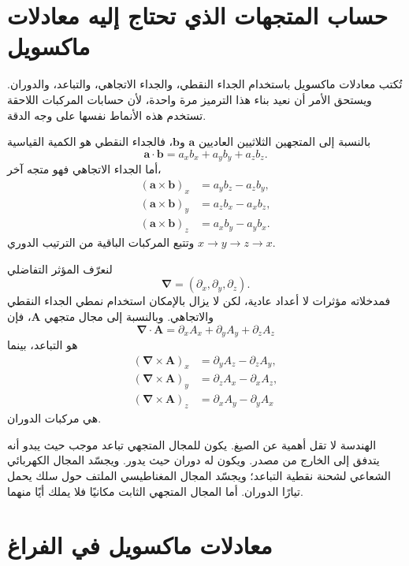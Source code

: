 \section{حساب المتجهات الذي تحتاج إليه معادلات ماكسويل}

تُكتب معادلات ماكسويل باستخدام الجداء النقطي، والجداء الاتجاهي، والتباعد، والدوران. ويستحق الأمر أن نعيد بناء هذا الترميز مرة واحدة، لأن حسابات المركبات اللاحقة تستخدم هذه الأنماط نفسها على وجه الدقة.

بالنسبة إلى المتجهين الثلاثيين العاديين \(\mathbf a\) و\(\mathbf b\)، فالجداء النقطي هو الكمية القياسية
\begin{equation}
\mathbf a\cdot\mathbf b
=a_xb_x+a_yb_y+a_zb_z.
\end{equation}
أما الجداء الاتجاهي فهو متجه آخر،
\begin{align}
(\mathbf a\times\mathbf b)_x&=a_yb_z-a_zb_y,\\
(\mathbf a\times\mathbf b)_y&=a_zb_x-a_xb_z,\\
(\mathbf a\times\mathbf b)_z&=a_xb_y-a_yb_x.
\end{align}
وتتبع المركبات الباقية من الترتيب الدوري \(x\to y\to z\to x\).

لنعرّف المؤثر التفاضلي
\begin{equation}
\boldsymbol\nabla=
\left(\partial_x,\partial_y,\partial_z\right).
\end{equation}
فمدخلاته مؤثرات لا أعداد عادية، لكن لا يزال بالإمكان استخدام نمطي الجداء النقطي والاتجاهي. وبالنسبة إلى مجال متجهي \(\mathbf A\)، فإن
\begin{equation}
\boldsymbol\nabla\cdot\mathbf A
=\partial_xA_x+\partial_yA_y+\partial_zA_z
\label{eq:divergence}
\end{equation}
هو التباعد، بينما
\begin{align}
(\boldsymbol\nabla\times\mathbf A)_x
 &=\partial_yA_z-\partial_zA_y,\\
(\boldsymbol\nabla\times\mathbf A)_y
 &=\partial_zA_x-\partial_xA_z,\\
(\boldsymbol\nabla\times\mathbf A)_z
 &=\partial_xA_y-\partial_yA_x
\label{eq:curl}
\end{align}
هي مركبات الدوران.

الهندسة لا تقل أهمية عن الصيغ. يكون للمجال المتجهي تباعد موجب حيث يبدو أنه يتدفق إلى الخارج من مصدر. ويكون له دوران حيث يدور. ويجسّد المجال الكهربائي الشعاعي لشحنة نقطية التباعد؛ ويجسّد المجال المغناطيسي الملتف حول سلك يحمل تيارًا الدوران. أما المجال المتجهي الثابت مكانيًا فلا يملك أيًا منهما.

\section{معادلات ماكسويل في الفراغ}

